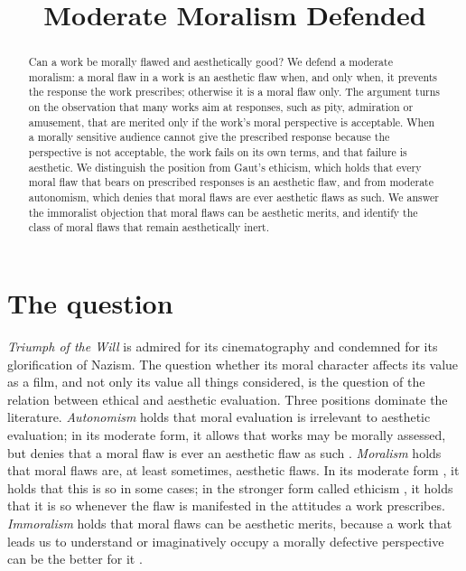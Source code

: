 \documentclass{situationist-preprint}
\title{Moderate Moralism Defended}
\begin{document}
\maketitle

\begin{abstract}
Can a work be morally flawed and aesthetically good? We defend a moderate moralism: a moral flaw in a work is an aesthetic flaw when, and only when, it prevents the response the work prescribes; otherwise it is a moral flaw only. The argument turns on the observation that many works aim at responses, such as pity, admiration or amusement, that are merited only if the work's moral perspective is acceptable. When a morally sensitive audience cannot give the prescribed response because the perspective is not acceptable, the work fails on its own terms, and that failure is aesthetic. We distinguish the position from Gaut's ethicism, which holds that every moral flaw that bears on prescribed responses is an aesthetic flaw, and from moderate autonomism, which denies that moral flaws are ever aesthetic flaws as such. We answer the immoralist objection that moral flaws can be aesthetic merits, and identify the class of moral flaws that remain aesthetically inert.
\end{abstract}

\section{The question}

\emph{Triumph of the Will} is admired for its cinematography and condemned for its glorification of Nazism. The question whether its moral character affects its value as a film, and not only its value all things considered, is the question of the relation between ethical and aesthetic evaluation. Three positions dominate the literature. \emph{Autonomism} holds that moral evaluation is irrelevant to aesthetic evaluation; in its moderate form, it allows that works may be morally assessed, but denies that a moral flaw is ever an aesthetic flaw as such \citep{AndersonDean1998}. \emph{Moralism} holds that moral flaws are, at least sometimes, aesthetic flaws. In its moderate form \citep{Carroll1996}, it holds that this is so in some cases; in the stronger form called ethicism \citep{Gaut1998}, it holds that it is so whenever the flaw is manifested in the attitudes a work prescribes. \emph{Immoralism} holds that moral flaws can be aesthetic merits, because a work that leads us to understand or imaginatively occupy a morally defective perspective can be the better for it \citep{Jacobson1997,Kieran2003}.
\end{document}

